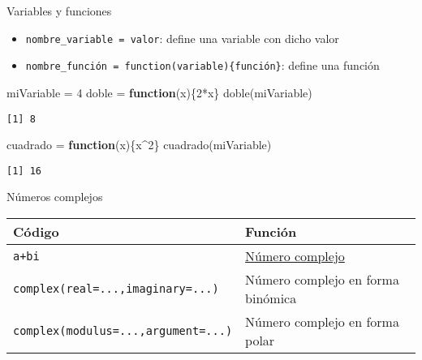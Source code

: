 \documentclass[
  ignorenonframetext,
]{beamer}
\newenvironment{Shaded}{\begin{snugshade}}{\end{snugshade}}
\newcommand{\ControlFlowTok}[1]{\textcolor[rgb]{0.13,0.29,0.53}{\textbf{#1}}}
\newcommand{\DecValTok}[1]{\textcolor[rgb]{0.00,0.00,0.81}{#1}}
\newcommand{\FunctionTok}[1]{\textcolor[rgb]{0.00,0.00,0.00}{#1}}
\newcommand{\NormalTok}[1]{#1}
\newcommand{\OtherTok}[1]{\textcolor[rgb]{0.56,0.35,0.01}{#1}}
\newcommand{\SpecialCharTok}[1]{\textcolor[rgb]{0.00,0.00,0.00}{#1}}
\providecommand{\tightlist}{%
  \setlength{\itemsep}{0pt}\setlength{\parskip}{0pt}}
\begin{document}
\begin{frame}[fragile]{Variables y funciones}
\protect\hypertarget{variables-y-funciones}{}
\begin{itemize}
\tightlist
\item
  \texttt{nombre\_variable\ =\ valor}: define una variable con dicho
  valor
\item
  \texttt{nombre\_función\ =\ function(variable)\{función\}}: define una
  función
\end{itemize}

\begin{Shaded}
\begin{Highlighting}[]
\NormalTok{miVariable }\OtherTok{=} \DecValTok{4}
\NormalTok{doble }\OtherTok{=} \ControlFlowTok{function}\NormalTok{(x)\{}\DecValTok{2}\SpecialCharTok{*}\NormalTok{x\}}
\FunctionTok{doble}\NormalTok{(miVariable)}
\end{Highlighting}
\end{Shaded}

\begin{verbatim}
[1] 8
\end{verbatim}

\begin{Shaded}
\begin{Highlighting}[]
\NormalTok{cuadrado }\OtherTok{=} \ControlFlowTok{function}\NormalTok{(x)\{x}\SpecialCharTok{\^{}}\DecValTok{2}\NormalTok{\}}
\FunctionTok{cuadrado}\NormalTok{(miVariable)}
\end{Highlighting}
\end{Shaded}

\begin{verbatim}
[1] 16
\end{verbatim}
\end{frame}

\begin{frame}[fragile]{Números complejos}
\protect\hypertarget{nuxfameros-complejos}{}
\begin{longtable}[]{@{}ll@{}}
\toprule
Código & Función \\
\midrule
\endhead
\texttt{a+bi} &
\href{https://es.wikipedia.org/wiki/Número_complejo}{Número complejo} \\
\texttt{complex(real=...,imaginary=...)} & Número complejo en forma
binómica \\
\texttt{complex(modulus=...,argument=...)} & Número complejo en forma
polar \\
\bottomrule
\end{longtable}
\end{frame}
\end{document}
